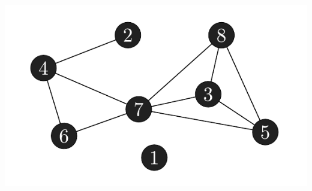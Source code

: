 \documentclass[xcolor=x11names,compress]{beamer}
\begin{document}
\begin{frame}
\begin{center}
\begin{overprint}
			\includegraphics[scale=1.0]{img/graph/peo_alternative.pdf}
		\end{overprint}
	\end{center}
\end{frame}
\end{document}
